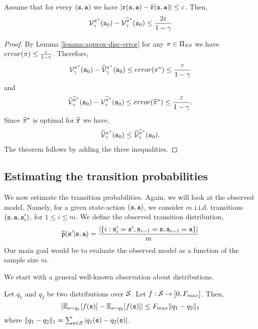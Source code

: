 \begin{theorem}
\label{thm:approx-model-disc}
%
Assume that for every $({\tt s},{\tt a})$ we have
$|{\tt r}({\tt s},{\tt a})-\widehat{{\tt r}}({\tt s},{\tt a})|\leq
\varepsilon$. Then,
\[
\mathcal{V}^{\pi^*}_\gamma({\tt s}_0) -
\mathcal{V}^{\widehat{\pi}^*}_\gamma({\tt s}_0) \leq
\frac{2\varepsilon}{1-\gamma}
\]
\end{theorem}

\begin{proof}
By Lemma \ref{lemma:approx-disc-error} for any $\pi\in {\Pi
_{SS}}$ we have $error(\pi)\leq
\frac{\varepsilon}{1-\gamma}$. Therefore,
\[
\mathcal{V}^{\pi^*}_\gamma({\tt s}_0)-
\widehat{\mathcal{V}}^{\pi^*}_\gamma({\tt s}_0)\leq
error(\pi^*)\leq \frac{\varepsilon}{1-\gamma}
\]
and
\[
\widehat{\mathcal{V}}^{\widehat{\pi}^*}_\gamma({\tt s}_0)-
\mathcal{V}^{\widehat{\pi}^*}_\gamma({\tt s}_0)\leq
error(\widehat{\pi}^*)\leq \frac{\varepsilon}{1-\gamma} .
\]
Since $\widehat{\pi}^*$ is optimal for $\widehat{{\tt r}}$ we
have,
\[
\widehat{\mathcal{V}}^{\pi^*}_\gamma({\tt s}_0)\leq
\widehat{\mathcal{V}}^{\widehat{\pi}^*}_\gamma({\tt s}_0) .
\]
The theorem follows by adding the three inequalities.
\end{proof}

\subsection{Estimating the transition probabilities}

We now estimate the transition probabilities. Again, we will look at
the observed model. Namely, for a given state-action
$({\tt s},{\tt a})$, we consider $m$ i.i.d.
 transitions
$({\tt s},{\tt a},{\tt s}'_i)$, for $1\leq i\leq m$. We define the
observed transition distribution,
\[
\widehat{{\tt p}}({\tt s}'|{\tt s},{\tt a})=\frac{|\{i:{\tt s}'_i={\tt s}',{\tt s}_{i-1}={\tt s},{\tt a}_{i-1}={\tt a}\}|}{m}
\]
Our main goal would be to evaluate the observed model as a function
of the sample size $m$.


We start with a general well-known observation about distributions.

\begin{theorem}
\label{thm:dist-l1} Let $q_1$ and $q_2$ be two distributions over
$\mathcal{S}$. Let $f:\mathcal{S} \rightarrow [0,F_{max}]$. Then,
\[
|\mathbb{E}_{s\sim q_1}[f({\tt s})]- \mathbb{E}_{s\sim q_2}[f({\tt s})]|\leq F_{max}
\|q_1-q_2\|_1
\]
where $\|q_1-q_2\|_1=\sum_{{\tt s} \in \mathcal{S}}
|q_1({\tt s})-q_2({\tt s})|$.
\end{theorem}

